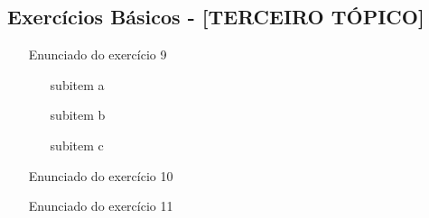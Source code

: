 \documentclass[11pt]{article}
\begin{document}
\begin{multicols}{2}
\section*{Exercícios Básicos - [TERCEIRO TÓPICO]}

\begin{enumerate}[leftmargin=*, start=9]

\item [Enunciado do exercício 9]

\begin{enumerate}[label=\alph*)]
\item [subitem a]
\item [subitem b]
\item [subitem c]
\end{enumerate}

\item [Enunciado do exercício 10]

\item [Enunciado do exercício 11]

\end{enumerate}

\end{multicols}
\end{document}
